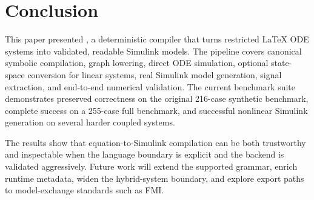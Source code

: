 \documentclass[colorlinks,upint,subscriptcorrection,varvw,balance,nofoot]{asmeconf}
\newcommand{\EqnToSim}{\NoCaseChange{Eqn2Sim}}
\begin{document}
\section{Conclusion}
This paper presented \EqnToSim{}, a deterministic compiler that turns restricted \LaTeX{} ODE systems into validated, readable Simulink models. The pipeline covers canonical symbolic compilation, graph lowering, direct ODE simulation, optional state-space conversion for linear systems, real Simulink model generation, signal extraction, and end-to-end numerical validation. The current benchmark suite demonstrates preserved correctness on the original 216-case synthetic benchmark, complete success on a 255-case full benchmark, and successful nonlinear Simulink generation on several harder coupled systems.

The results show that equation-to-Simulink compilation can be both trustworthy and inspectable when the language boundary is explicit and the backend is validated aggressively. Future work will extend the supported grammar, enrich runtime metadata, widen the hybrid-system boundary, and explore export paths to model-exchange standards such as FMI.



\end{document}
